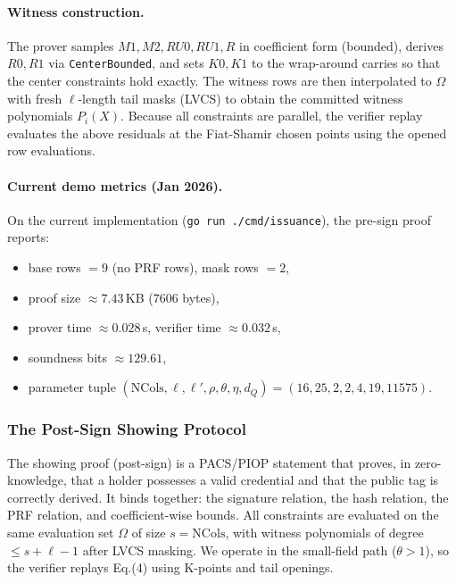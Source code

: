 \paragraph{Witness construction.}
The prover samples $M1,M2,RU0,RU1,R$ in coefficient form (bounded), derives $R0,R1$ via \texttt{CenterBounded}, and sets
$K0,K1$ to the wrap-around carries so that the center constraints hold exactly. The witness rows are then interpolated to
$\Omega$ with fresh $\ell$-length tail masks (LVCS) to obtain the committed witness polynomials $P_i(X)$. Because all
constraints are parallel, the verifier replay evaluates the above residuals at the Fiat-Shamir chosen points using the
opened row evaluations.

\paragraph{Current demo metrics (Jan 2026).}
On the current implementation (\texttt{go run ./cmd/issuance}), the pre-sign proof reports:
\begin{itemize}
  \item base rows $=9$ (no PRF rows), mask rows $=2$,
  \item proof size $\approx 7.43$\,KB ($7606$ bytes),
  \item prover time $\approx 0.028$\,s, verifier time $\approx 0.032$\,s,
  \item soundness bits $\approx 129.61$,
  \item parameter tuple $(\mathrm{NCols},\ell,\ell',\rho,\theta,\eta,d_Q)=(16,25,2,2,4,19,11575)$.
\end{itemize}

\subsubsection{The Post-Sign Showing Protocol}
The showing proof (post-sign) is a PACS/PIOP statement that proves, in zero-knowledge, that a holder possesses a valid
credential and that the public tag is correctly derived. It binds together: the signature relation, the hash relation,
the PRF relation, and coefficient-wise bounds. All constraints are evaluated on the same evaluation set $\Omega$ of size
$s=\mathrm{NCols}$, with witness polynomials of degree $\le s+\ell-1$ after LVCS masking. We operate in the small-field
path ($\theta>1$), so the verifier replays Eq.(4) using K-points and tail openings.


